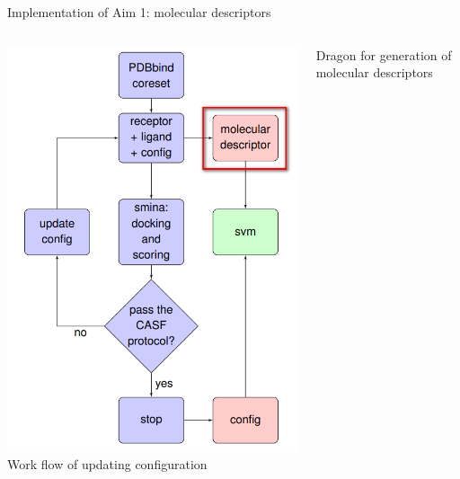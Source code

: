 \begin{frame}{Implementation of Aim 1: molecular descriptors}
   \begin{columns}
       \begin{column}{0.4\textwidth}
        \includegraphics[height=0.8\textheight]{../figures/method_rdkit.png}\\
      {\scriptsize Work flow of updating configuration}
    \end{column}
    \begin{column}{0.55\textwidth}
\begin{block}{Dragon for generation of molecular descriptors}

\end{block}
\end{column}
\end{columns}
\end{frame}
